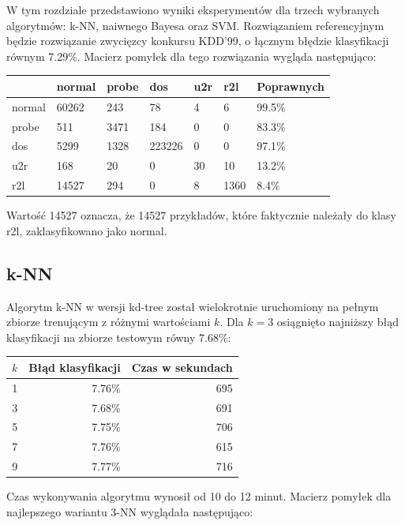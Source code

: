 \documentclass[a4paper, 12pt]{article}
\begin{document}
W tym rozdziale przedstawiono wyniki eksperymentów dla trzech wybranych algorytmów:
k-NN, naiwnego Bayesa oraz SVM. 
Rozwiązaniem referencyjnym będzie rozwiązanie zwycięzcy konkursu KDD'99,
o łącznym błędzie klasyfikacji równym 7.29\%. Macierz pomyłek dla 
tego rozwiązania wygląda następująco:

\begin{table}[H]
\centering
\begin{tabular}{ | l | l | l | l | l | l | l | } \hline
	& normal & probe & dos 	& u2r 	& r2l 	& Poprawnych	\\ \hline
normal 	& 60262 & 243 	& 78	& 4	& 6 	& 99.5\% 	\\ \hline
probe 	& 511 	& 3471 	& 184	& 0	& 0 	& 83.3\% 	\\ \hline
dos 	& 5299 	& 1328 	& 223226& 0 	& 0 	& 97.1\% 	\\ \hline
u2r 	& 168 	& 20 	& 0	& 30	& 10	& 13.2\%	\\ \hline
r2l 	& 14527 & 294 	& 0	& 8	& 1360	& 8.4\%		\\ \hline
\end{tabular} 
\end{table}

Wartość 14527 oznacza, że 14527 przykładów, które faktycznie należały do klasy r2l, zaklasyfikowano
jako normal.

\subsection{k-NN}

Algorytm k-NN w wersji kd-tree został wielokrotnie uruchomiony na pełnym zbiorze trenującym
z różnymi wartościami $k$.
Dla $k=3$ osiągnięto najniższy błąd klasyfikacji na zbiorze testowym równy 7.68\%:

\begin{table}[H]
\centering
\begin{tabular}{ | r | r | r | } \hline
$k$ & Błąd klasyfikacji & Czas w sekundach \\ \hline
1 & 7.76\% & 695 \\ \hline
3 & 7.68\% & 691 \\ \hline
5 & 7.75\% & 706 \\ \hline
7 & 7.76\% & 615 \\ \hline
9 & 7.77\% & 716 \\ \hline
\end{tabular} 
\end{table}

Czas wykonywania algorytmu wynosił od 10 do 12 minut.
Macierz pomyłek dla najlepszego wariantu 3-NN wyglądała następująco:
\end{document}
